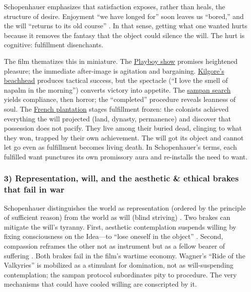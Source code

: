Schopenhauer emphasizes that satisfaction exposes, rather than heals, the structure of desire.
Enjoyment ``we have longed for'' soon leaves us ``bored,'' and the will ``returns to its old
course'' \parencite[p.~319]{SchopenhauerWWR1969}. In that sense, getting what one wanted hurts
because it removes the fantasy that the object could silence the will. The hurt is cognitive:
fulfillment disenchants.

The film thematizes this in miniature. The \hyperref[scene:playboy-show]{Playboy show}
promises heightened pleasure; the immediate after-image is agitation and bargaining.
\hyperref[scene:kilgore-beach]{Kilgore's beachhead} produces tactical success, but the
spectacle (``I love the smell of napalm in the morning'') converts victory into appetite. The
\hyperref[scene:sampan]{sampan search} yields compliance, then horror; the ``completed''
procedure reveals leanness of soul. The \hyperref[scene:french-plantation]{French plantation}
stages fulfillment frozen: the colonists achieved everything the will projected (land, dynasty,
permanence) and discover that possession does not pacify. They live among their buried dead,
clinging to what they won, trapped by their own achievement. The will got its object and
cannot let go even as fulfillment becomes living death. In Schopenhauer's terms, each
fulfilled want punctures its own promissory aura and re-installs the need to want.

\subsubsection*{3) Representation, will, and the aesthetic \& ethical brakes that fail in war}

Schopenhauer distinguishes the world as representation (ordered by the principle of sufficient
reason) from the world as will (blind striving) \parencite[pp.~3--5]{SchopenhauerWWR1969}.
Two brakes can mitigate the will's tyranny. First, aesthetic contemplation suspends willing by
fixing consciousness on the Idea—to ``lose oneself in the object''
\parencite[p.~178]{SchopenhauerWWR1969}. Second, compassion reframes the other not as instrument
but as a fellow bearer of suffering \parencite[pp.~372--374]{SchopenhauerWWR1969}.
Both brakes fail in the film's wartime economy. Wagner's ``Ride of the Valkyries'' is mobilized
as a stimulant for domination, not as will-suspending contemplation; the sampan protocol
subordinates pity to procedure. The very mechanisms that could have cooled willing are
conscripted by it.

